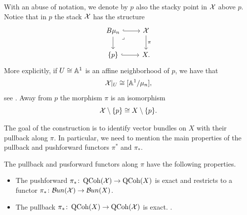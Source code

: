\documentclass{article}
\begin{document}
With an abuse of notation, we denote by $p$ also the stacky point in $\mathcal{X}$ above $p$. Notice that in $p$ the stack $\mathcal{X}$ has the structure
\begin{equation}\label{punctual structure X}
\begin{tikzcd}
	{B\mu_n} & \Xc \\
	{\{p\}} & X.
	\arrow[hook, from=1-1, to=1-2]
	\arrow[from=1-1, to=2-1]
	\arrow["\lrcorner"{anchor=center, pos=0.125}, draw=none, from=1-1, to=2-2]
	\arrow["\pi", from=1-2, to=2-2]
	\arrow[hook, from=2-1, to=2-2]
\end{tikzcd}
\end{equation}
More explicitly, if $U \cong \mathbb{A}^1$ is an affine neighborhood of $p$, we have that
\begin{equation}\label{X|U}
\mathcal{X}\vert_U \cong [\mathbb{A}^1/\mu_n],
\end{equation}
see \cite[Lemma 2.3.1]{Cadman}.
Away from $p$ the morphism $\pi$ is an isomorphism
\begin{equation}\label{X-p}
\mathcal{X} \setminus \{ p \} \cong X \setminus \{p\}.
\end{equation}

The goal of the construction is to identify vector bundles on $X$ with their pullback along $\pi$. In particular, we need to mention the main properties of the pullback and pushforward functors $\pi^*$ and $\pi_*$.
\begin{prop} \label{properties of pullback and pushforward}
The pullback and pusforward functors along $\pi$ have the following properties.
\begin{itemize}
    \item The pushforward $\pi_* \colon \operatorname{QCoh}(\mathcal{X}) \to \operatorname{QCoh}(X)$ is exact and restricts to a functor $\pi_* \colon \mathcal{B}\kern -.5pt un(\mathcal{X}) \to \mathcal{B}\kern -.5pt un(X)$. \cite[Theorem 2.3.4]{abramovich-vistoli}
    \item The pullback $\pi_* \colon \operatorname{QCoh}(X) \to \operatorname{QCoh}(\mathcal{X})$ is exact. \cite[Proposition 1.2.3]{Taams}. 
\end{itemize}
\end{prop}
\end{document}

